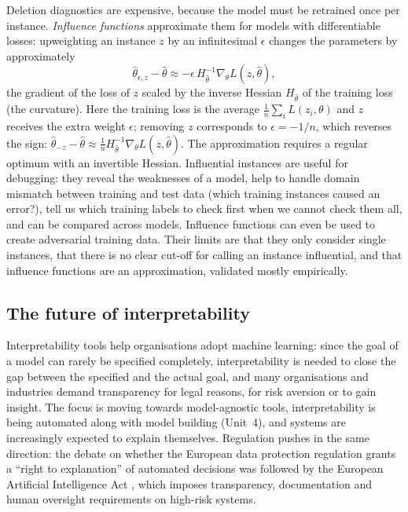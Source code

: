 Deletion diagnostics are expensive, because the model must be retrained once per instance.
\emph{Influence functions} \citep{koh2017understanding} approximate them for models with differentiable
losses: upweighting an instance $z$ by an infinitesimal $\epsilon$ changes the parameters by
approximately
\begin{equation}
  \hat\theta_{\epsilon,z}-\hat\theta\approx-\epsilon\,H_{\hat\theta}^{-1}\nabla_\theta L(z,\hat\theta),
\end{equation}
the gradient of the loss of $z$ scaled by the inverse Hessian $H_{\hat\theta}$ of the training loss (the
curvature). Here the training loss is the average $\frac1n\sum_iL(z_i,\theta)$ and $z$ receives the extra
weight $\epsilon$; removing $z$ corresponds to $\epsilon=-1/n$, which reverses the sign:
$\hat\theta_{-z}-\hat\theta\approx\frac1n H_{\hat\theta}^{-1}\nabla_\theta L(z,\hat\theta)$. The approximation
requires a regular optimum with an invertible Hessian. Influential instances are useful for debugging: they reveal the weaknesses of a
model, help to handle domain mismatch between training and test data (which training instances caused an
error?), tell us which training labels to check first when we cannot check them all, and can be compared
across models. Influence functions can even be used to create adversarial training data. Their limits are that
they only consider single instances, that there is no clear cut-off for calling an instance influential, and
that influence functions are an approximation, validated mostly empirically.

\subsection{The future of interpretability}

Interpretability tools help organisations adopt machine learning: since the goal of a model can rarely be
specified completely, interpretability is needed to close the gap between the specified and the actual
goal, and many organisations and industries demand transparency for legal reasons, for risk aversion or
to gain insight. The focus is moving towards model-agnostic tools, interpretability is being automated
along with model building (Unit~4), and systems are increasingly expected to explain themselves.
Regulation pushes in the same direction: the debate on whether the European data protection regulation
grants a ``right to explanation'' of automated decisions \citep{goodman2017european,wachter2018counterfactual}
was followed by the European Artificial Intelligence Act \citep{eu2024aiact}, which imposes transparency,
documentation and human oversight requirements on high-risk systems.

